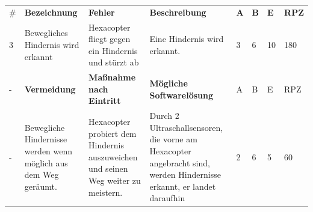 \begin{longtable}{|p{0.4cm}|p{3.0cm}|p{3.1cm}|p{3.1cm}|p{0.4cm}|p{0.4cm}|p{0.4cm}|p{0.8cm}|}
\hline \#   & \textbf{Bezeichnung}                                                                                               & \textbf{Fehler}                                                                                                                & \textbf{Beschreibung}                                                                                                                    & \textbf{A}   & \textbf{B}   & \textbf{E}   & \textbf{RPZ} \\
 3          & Bewegliches Hindernis wird erkannt                                                                        & Hexacopter fliegt gegen ein Hindernis und stürzt ab                                                                   & Eine Hindernis wird erkannt.                                                                                                    & 3   & 6   & 10  & 180 \\
\hline -    & \textbf{Vermeidung}                                                                                                & \textbf{Maßnahme nach Eintritt}                                                                                                & \textbf{Mögliche Softwarelösung}                                                                                                         & A   & B   & E   & RPZ \\
 -          & Bewegliche Hindernisse werden wenn möglich aus dem Weg geräumt.                                           & Hexacopter probiert dem Hindernis auszuweichen und seinen Weg weiter zu meistern.                                     & Durch 2 Ultraschallsensoren, die vorne am Hexacopter angebracht sind, werden Hindernisse erkannt, er landet daraufhin           & 2   & 6   & 5   & 60  \\\hline


\end{longtable}
